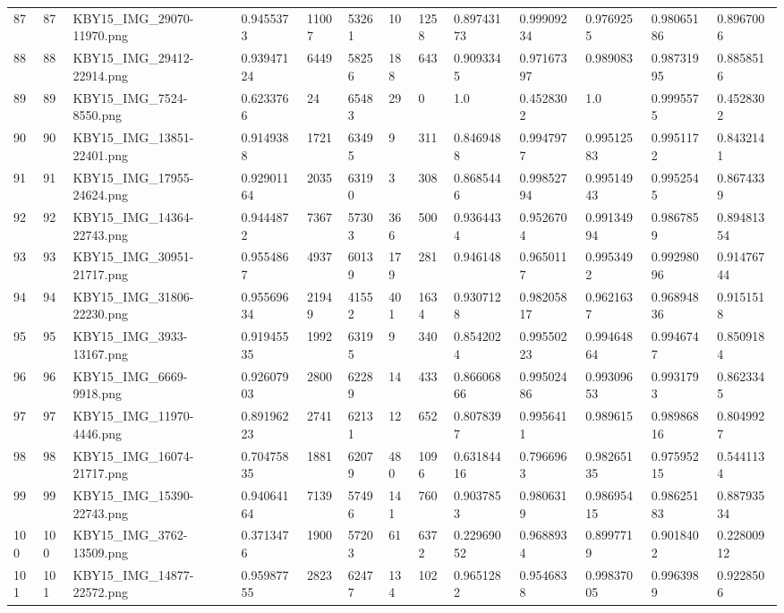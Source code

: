 \documentclass[11pt, a4paper, twoside]{report}
\begin{document}
\begin{longtable}[c]{@{}lllllllllllll@{}}
87 & 87 & KBY15\_IMG\_29070-11970.png & 0.9455373 & 11007 & 53261 & 10 & 1258 & 0.89743173 & 0.99909234 & 0.9769255 & 0.98065186 & 0.8967006 \\
88 & 88 & KBY15\_IMG\_29412-22914.png & 0.93947124 & 6449 & 58256 & 188 & 643 & 0.9093345 & 0.97167397 & 0.989083 & 0.98731995 & 0.8858516 \\
89 & 89 & KBY15\_IMG\_7524-8550.png & 0.6233766 & 24 & 65483 & 29 & 0 & 1.0 & 0.4528302 & 1.0 & 0.9995575 & 0.4528302 \\
90 & 90 & KBY15\_IMG\_13851-22401.png & 0.9149388 & 1721 & 63495 & 9 & 311 & 0.8469488 & 0.9947977 & 0.99512583 & 0.9951172 & 0.8432141 \\
91 & 91 & KBY15\_IMG\_17955-24624.png & 0.92901164 & 2035 & 63190 & 3 & 308 & 0.8685446 & 0.99852794 & 0.99514943 & 0.9952545 & 0.8674339 \\
92 & 92 & KBY15\_IMG\_14364-22743.png & 0.9444872 & 7367 & 57303 & 366 & 500 & 0.9364434 & 0.9526704 & 0.99134994 & 0.9867859 & 0.89481354 \\
93 & 93 & KBY15\_IMG\_30951-21717.png & 0.9554867 & 4937 & 60139 & 179 & 281 & 0.946148 & 0.9650117 & 0.9953492 & 0.99298096 & 0.91476744 \\
94 & 94 & KBY15\_IMG\_31806-22230.png & 0.95569634 & 21949 & 41552 & 401 & 1634 & 0.9307128 & 0.98205817 & 0.9621637 & 0.96894836 & 0.9151518 \\
95 & 95 & KBY15\_IMG\_3933-13167.png & 0.91945535 & 1992 & 63195 & 9 & 340 & 0.8542024 & 0.99550223 & 0.99464864 & 0.9946747 & 0.8509184 \\
96 & 96 & KBY15\_IMG\_6669-9918.png & 0.92607903 & 2800 & 62289 & 14 & 433 & 0.86606866 & 0.99502486 & 0.99309653 & 0.9931793 & 0.8623345 \\
97 & 97 & KBY15\_IMG\_11970-4446.png & 0.89196223 & 2741 & 62131 & 12 & 652 & 0.8078397 & 0.9956411 & 0.989615 & 0.98986816 & 0.8049927 \\
98 & 98 & KBY15\_IMG\_16074-21717.png & 0.70475835 & 1881 & 62079 & 480 & 1096 & 0.63184416 & 0.7966963 & 0.98265135 & 0.97595215 & 0.5441134 \\
99 & 99 & KBY15\_IMG\_15390-22743.png & 0.94064164 & 7139 & 57496 & 141 & 760 & 0.9037853 & 0.9806319 & 0.98695415 & 0.98625183 & 0.88793534 \\
100 & 100 & KBY15\_IMG\_3762-13509.png & 0.3713476 & 1900 & 57203 & 61 & 6372 & 0.22969052 & 0.9688934 & 0.8997719 & 0.9018402 & 0.22800912 \\
101 & 101 & KBY15\_IMG\_14877-22572.png & 0.95987755 & 2823 & 62477 & 134 & 102 & 0.9651282 & 0.9546838 & 0.99837005 & 0.9963989 & 0.9228506 \\

\end{longtable}
\end{document}
